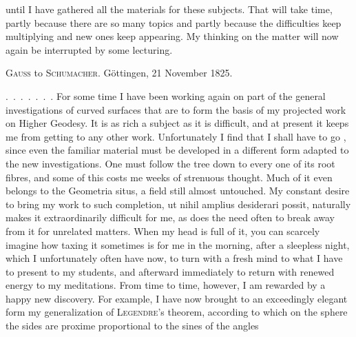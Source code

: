 %
until I have gathered all the materials for these subjects. That will take time, partly because there are so many topics and partly because the difficulties keep multiplying and new ones keep appearing. My thinking on the matter will now again be interrupted by some lecturing.
\par{}
\begin{center}\textsc{Gauss} to \textsc{Schumacher}. Göttingen, 21 November 1825.\end{center}
\indent\mbox{. . . . . . .} For some time I have been working again on part of the general investigations of curved surfaces that are to form the basis of my projected work on Higher Geodesy. It is as rich a subject as it is difficult, and at present it keeps me from getting to any other work. Unfortunately I find that I shall have to go , since even the familiar material must be developed in a different form adapted to the new investigations. One must follow the tree down to every one of its root fibres, and some of this costs me weeks of strenuous thought. Much of it even belongs to the Geometria situs, a field still almost untouched. My constant desire to bring my work to such completion, ut nihil amplius desiderari possit, naturally makes it extraordinarily difficult for me, as does the need often to break away from it for unrelated matters. When my head is full of it, you can scarcely imagine how taxing it sometimes is for me in the morning, after a sleepless night, which I unfortunately often have now, to turn with a fresh mind to what I have to present to my students, and afterward immediately to return with renewed energy to my meditations. From time to time, however, I am rewarded by a happy new discovery. For example, I have now brought to an exceedingly elegant form my generalization of \textsc{Legendre}'s theorem, according to which on the sphere the sides are proxime proportional to the sines of the angles
